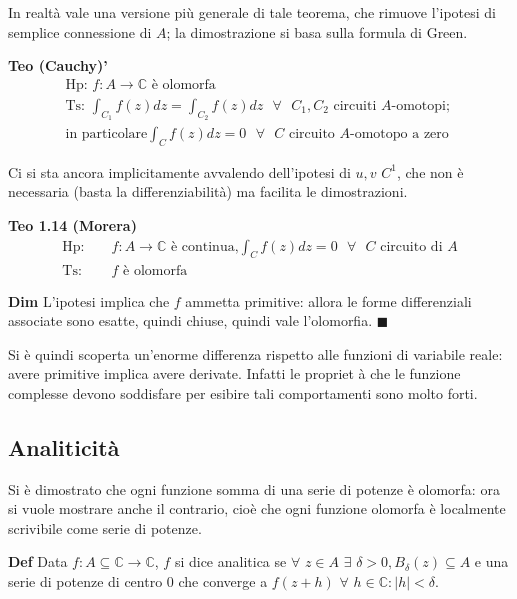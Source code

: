 \documentclass{article}
\begin{document}
In realt\`{a} vale una versione pi\`{u} generale di tale teorema, che
rimuove l'ipotesi di semplice connessione di $A$; la dimostrazione si basa
sulla formula di Green.

\textbf{Teo (Cauchy)'}%
\begin{gather*}
\text{Hp: }f:A\rightarrow 
\mathbb{C}
\text{ \`{e} olomorfa} \\
\text{Ts: }\int_{C_{1}}f\left( z\right) dz=\int_{C_{2}}f\left( z\right) dz%
\text{ }\forall \text{ }C_{1},C_{2}\text{ circuiti }A\text{-omotopi; } \\
\text{in particolare}\int_{C}f\left( z\right) dz=0\text{ }\forall \text{ }C%
\text{ circuito }A\text{-omotopo a zero}
\end{gather*}

Ci si sta ancora implicitamente avvalendo dell'ipotesi di $u,v$ $C^{1}$, che
non \`{e} necessaria (basta la differenziabilit\`{a}) ma facilita le
dimostrazioni.

\textbf{Teo 1.14 (Morera)}%
\begin{eqnarray*}
\text{Hp}\text{: } &&f:A\rightarrow 
\mathbb{C}
\text{ \`{e} continua,}\int_{C}f\left( z\right) dz=0\text{ }\forall \text{ }C%
\text{ circuito di }A \\
\text{Ts}\text{: } &&f\text{ \`{e} olomorfa}
\end{eqnarray*}

\textbf{Dim} L'ipotesi implica che $f$ ammetta primitive: allora le forme
differenziali associate sono esatte, quindi chiuse, quindi vale l'olomorfia. 
$\blacksquare $

Si \`{e} quindi scoperta un'enorme differenza rispetto alle funzioni di
variabile reale: avere primitive implica avere derivate. Infatti le propriet%
\`{a} che le funzione complesse devono soddisfare per esibire tali
comportamenti sono molto forti.

\subsection{Analiticit\`{a}}

Si \`{e} dimostrato che ogni funzione somma di una serie di potenze \`{e}
olomorfa: ora si vuole mostrare anche il contrario, cio\`{e} che ogni
funzione olomorfa \`{e} localmente scrivibile come serie di potenze.

\textbf{Def} Data $f:A\subseteq 
\mathbb{C}
\rightarrow 
\mathbb{C}
$, $f$ si dice analitica se $\forall $ $z\in A$ $\exists $ $\delta
>0,B_{\delta }\left( z\right) \subseteq A$ e una serie di potenze di centro $%
0$ che converge a $f\left( z+h\right) $ $\forall $ $h\in 
\mathbb{C}
:\left\vert h\right\vert <\delta $.
\end{document}
